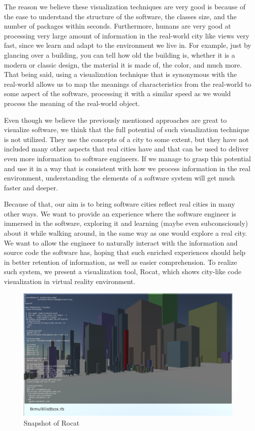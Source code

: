 \documentclass[conference]{IEEEtran}
\begin{document}
The reason we believe these visualization techniques are very good is because of the ease to understand the structure of the software, the classes size, and the number of packages within seconds.
Furthermore, humans are very good at processing very large amount of information in the real-world city like views very fast, since we learn and adapt to the environment we live in.
For example, just by glancing over a building, you can tell how old the building is, whether it is a modern or classic design, the material it is made of, the color, and much more.
That being said, using a visualization technique that is synonymous with the real-world allows us to map the meanings of characteristics from the real-world to some aspect of the software, processing it with a similar speed as we would process the meaning of the real-world object.

Even though we believe the previously mentioned approaches are great to visualize software, we think that the full potential of such visualization technique is not utilized.
They use the concepts of a city to some extent, but they have not included many other aspects that real cities have and that can be used to deliver even more information to software engineers.
If we manage to grasp this potential and use it in a way that is consistent with how we process information in the real environment, understanding the elements of a software system will get much faster and deeper.

Because of that, our aim is to bring software cities reflect real cities in many other ways.
We want to provide an experience where the software engineer is immersed in the software, exploring it and learning (maybe even subconsciously) about it while walking around, in the same way as one would explore a real city.
We want to allow the engineer to naturally interact with the information and source code the software has, hoping that such enriched experiences should help in better retention of information, as well as easier comprehension.
To realize such system, we present a visualization tool, \textsf{Rocat}, which shows city-like code visualization in virtual reality environment.

\begin{figure}[t!]
\centering
\includegraphics[bb=0 0 1598 937, width=18cm]{rocat.png}
\caption{Snapshot of \textsf{Rocat}}
\label{figure:Rocat}
\end{figure}
\end{document}
